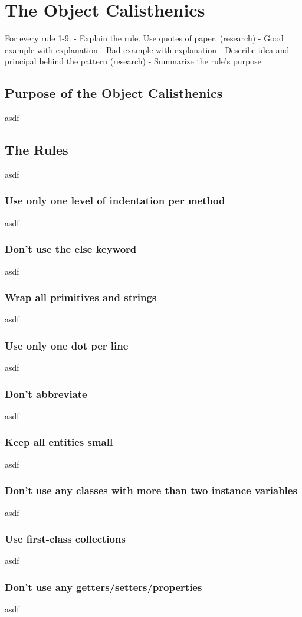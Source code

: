 \chapter{The Object Calisthenics}
For every rule 1-9: 
 - Explain the rule. Use quotes of paper. (research)
 - Good example with explanation
 - Bad example with explanation
 - Describe idea and principal behind the pattern (research)
 - Summarize the rule's purpose
\section{Purpose of the Object Calisthenics}
asdf
\section{The Rules}
asdf
\subsection{Use only one level of indentation per method}
asdf
\subsection{Don’t use the else keyword}
asdf
\subsection{Wrap all primitives and strings}
asdf
\subsection{Use only one dot per line}
asdf
\subsection{Don't abbreviate}
asdf
\subsection{Keep all entities small}
asdf
\subsection{Don't use any classes with more than two instance variables}
asdf
\subsection{Use first-class collections}
asdf
\subsection{Don’t use any getters/setters/properties}
asdf
